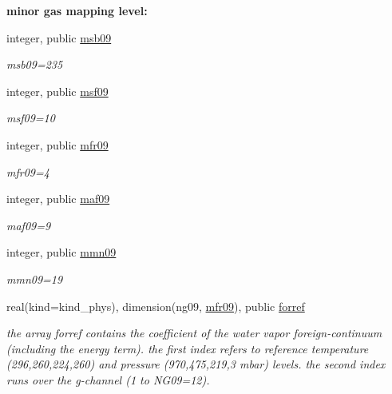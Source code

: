 \begin{Indent}\textbf{ minor gas mapping level\+:}\par
\begin{DoxyCompactItemize}
\item 
integer, public \hyperlink{group__module__radlw__kgbnn_ga7e6bb7acb0df29586d0bd52f3fc41d90}{msb09}
\begin{DoxyCompactList}\small\item\em msb09=235 \end{DoxyCompactList}\item 
integer, public \hyperlink{group__module__radlw__kgbnn_ga7d728ef04b3f26c6b20149084334be5a}{msf09}
\begin{DoxyCompactList}\small\item\em msf09=10 \end{DoxyCompactList}\item 
integer, public \hyperlink{group__module__radlw__kgbnn_ga777f63022c4f7187446945c6e6ba77e7}{mfr09}
\begin{DoxyCompactList}\small\item\em mfr09=4 \end{DoxyCompactList}\item 
integer, public \hyperlink{group__module__radlw__kgbnn_ga7d5d565c87af7ef07dc17930f9cb9e57}{maf09}
\begin{DoxyCompactList}\small\item\em maf09=9 \end{DoxyCompactList}\item 
integer, public \hyperlink{group__module__radlw__kgbnn_gaa9c8294b56ac3ce90b07114e986777a9}{mmn09}
\begin{DoxyCompactList}\small\item\em mmn09=19 \end{DoxyCompactList}\item 
real(kind=kind\+\_\+phys), dimension(ng09, \hyperlink{group__module__radlw__kgbnn_ga777f63022c4f7187446945c6e6ba77e7}{mfr09}), public \hyperlink{group__module__radlw__kgbnn_ga72a8c0879636dba20e2a8a35ba79f681}{forref}
\begin{DoxyCompactList}\small\item\em the array forref contains the coefficient of the water vapor foreign-\/continuum (including the energy term). the first index refers to reference temperature (296,260,224,260) and pressure (970,475,219,3 mbar) levels. the second index runs over the g-\/channel (1 to N\+G09=12). \end{DoxyCompactList}\item 

\end{DoxyCompactItemize}
\end{Indent}
